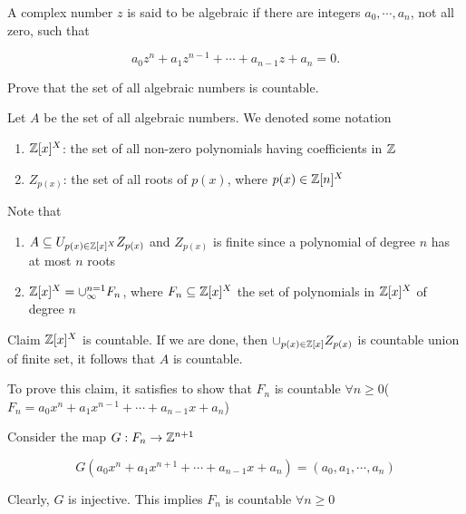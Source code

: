 A complex number $z$ is said to be algebraic if there are integers $a_0,\cdots,a_n$, not all zero, such that

$$a_0z^n + a_1z^{n-1} + \cdots + a_{n-1}z + a_n = 0.$$

Prove that the set of all algebraic numbers is countable.

\begin{tcolorbox}
	\begin{solution}
		Let $A$ be the set of all algebraic numbers. We denoted some notation
		
		\begin{enumerate}
			\item $\mathbb{Z} [x]^X$: the set of all non-zero polynomials having coefficients in $\mathbb{Z}$
			\item $Z_{p(x)}$: the set of all roots of $p(x)$, where $p(x) \in \mathbb{Z}[n]^X$
		\end{enumerate}
		
		Note that 
		
		\begin{enumerate}
			\item $A \subseteq U_{p(x) \in \mathbb{Z}[x]^X}Z_{p(x)}$ and $Z_{p(x)}$ is finite since a polynomial of degree $n$ has at most $n$ roots
			\item $\mathbb{Z}[x]^X = \cup^{n=1}_{\infty}F_n$, where $F_n \subseteq \mathbb{Z}[x]^X$ the set of polynomials in $\mathbb{Z}[x]^X$ of degree $n$
		\end{enumerate}
		
		Claim $\mathbb{Z}[x]^X$ is countable. If we are done, then $\cup_{p(x) \in \mathbb{Z}[x]} Z_{p(x)}$ is countable union of finite set, it follows that $A$ is countable.
		
		To prove this claim, it satisfies to show that $F_n$ is countable $\forall n \geq 0$($F_n = a_0x^n + a_1x^{n-1} + \cdots + a_{n-1}x + a_n$)
		
		Consider the map $G: F_n \rightarrow \mathbb{Z}^{n+1}$
		
		$$G(a_0x^n + a_1x^{n+1} + \cdots + a_{n-1}x + a_n) = (a_0,a_1,\cdots,a_n)$$
		
		Clearly, $G$ is injective. This implies $F_n$ is countable $\forall n \geq 0$
	\end{solution}
\end{tcolorbox}










